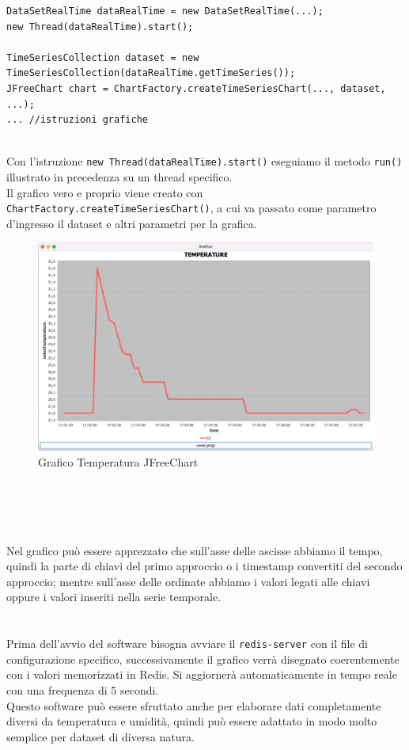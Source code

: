 \begin{lstlisting}[autogobble, title={\texttt{DataSetRealTime.java}}]
DataSetRealTime dataRealTime = new DataSetRealTime(...);
new Thread(dataRealTime).start();

TimeSeriesCollection dataset = new TimeSeriesCollection(dataRealTime.getTimeSeries());
JFreeChart chart = ChartFactory.createTimeSeriesChart(..., dataset, ...);
... //istruzioni grafiche
\end{lstlisting}
\\
Con l'istruzione \texttt{new Thread(dataRealTime).start()} eseguiamo il metodo \texttt{run()}
illustrato in precedenza su un thread specifico.\\
Il grafico vero e proprio viene creato con \texttt{ChartFactory.createTimeSeriesChart()}, a cui
va passato come parametro d'ingresso il dataset e altri parametri per la grafica.

\begin{figure}[H]
\includegraphics[width=1\textwidth]{img/chartTemperature}
    \caption{Grafico Temperatura JFreeChart}
\end{figure}\\
\\
\\
\\
Nel grafico può essere apprezzato che sull'asse delle ascisse abbiamo il tempo, quindi la parte di chiavi del primo approccio o i timestamp convertiti del secondo approccio;
mentre sull'asse delle ordinate abbiamo i valori legati alle chiavi oppure i valori inseriti nella serie temporale.\\
\\
\\
Prima dell'avvio del software bisogna avviare il \texttt{redis-server} con il file di configurazione specifico,
successivamente il grafico verrà disegnato coerentemente con i valori memorizzati in Redis.
Si aggiornerà automaticamente in tempo reale con una frequenza di 5 secondi.\\
Questo software può essere sfruttato anche per elaborare dati completamente diversi da temperatura e umidità, quindi può essere
adattato in modo molto semplice per dataset di diversa natura.

